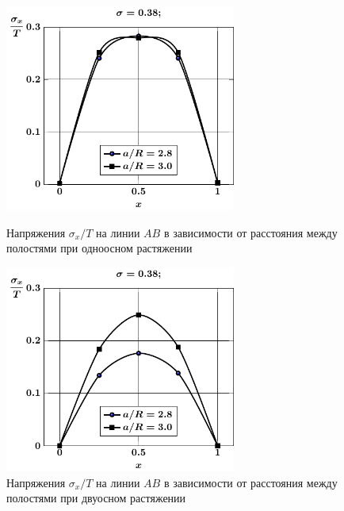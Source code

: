 \begin{russian}
\begin{figure}[h!]
\centering\footnotesize
\parbox[b]{7.5cm}{\centering\includegraphics[width=7.6cm]{periodic-spheres-cav27-a-t1-sig_x.pdf}
\caption{Напряжения $\sigma_x/T$ на линии $AB$ в зависимости от расстояния между полостями при одноосном растяжении
\label{f:11:4}}}\hfil\hfil
\parbox[b]{7.5cm}{\centering\includegraphics[width=7.6cm]{periodic-spheres-cav27-a-t2-sig_x.pdf}
\caption{Напряжения $\sigma_x/T$ на линии $AB$ в зависимости от расстояния между полостями при двуосном растяжении
\label{f:11:5}}}
\end{figure}


\end{russian}
